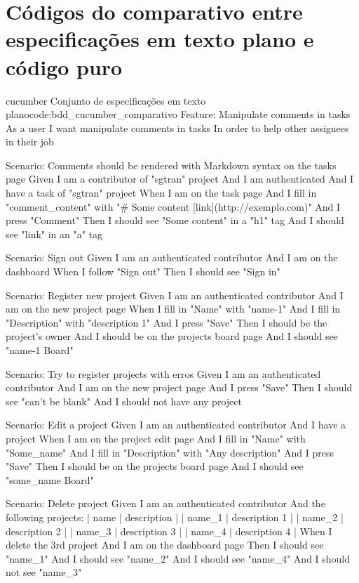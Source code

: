\chapter{Códigos do comparativo entre especificações em texto plano e código puro} %
\label{cha:codigo_do_comparativo}

\begin{mycode}{cucumber}%
{Conjunto de especificações em texto plano}{code:bdd_cucumber_comparativo}
Feature: Manipulate comments in tasks
  As a user
  I want manipulate comments in tasks
  In order to help other assignees in their job

  Scenario: Comments should be rendered with Markdown syntax on the tasks page
    Given I am a contributor of "sgtran" project
    And I am authenticated
    And I have a task of "sgtran" project
    When I am on the task page
    And I fill in "comment_content" with "# Some content [link](http://exemplo.com)"
    And I press "Comment"
    Then I should see "Some content" in a "h1" tag
    And I should see "link" in an "a" tag

  Scenario: Sign out
    Given I am an authenticated contributor
    And I am on the dashboard
    When I follow "Sign out"
    Then I should see "Sign in"

  Scenario: Register new project
    Given I am an authenticated contributor
    And I am on the new project page
    When I fill in "Name" with "name-1"
    And I fill in "Description" with "description 1"
    And I press "Save"
    Then I should be the project's owner
    And I should be on the projects board page
    And I should see "name-1 Board"

  Scenario: Try to register projects with erros
    Given I am an authenticated contributor
    And I am on the new project page
    And I press "Save"
    Then I should see "can't be blank"
    And I should not have any project

  Scenario: Edit a project
    Given I am an authenticated contributor
    And I have a project
    When I am on the project edit page
    And I fill in "Name" with "Some_name"
    And I fill in "Description" with "Any description"
    And I press "Save"
    Then I should be on the projects board page
    And I should see "some_name Board"

  Scenario: Delete project
    Given I am an authenticated contributor
    And the following projects:
      | name   | description   |
      | name_1 | description 1 |
      | name_2 | description 2 |
      | name_3 | description 3 |
      | name_4 | description 4 |
    When I delete the 3rd project
    And I am on the dashboard page
    Then I should see "name_1"
    And I should see "name_2"
    And I should see "name_4"
    And I should not see "name_3"


\end{mycode}
